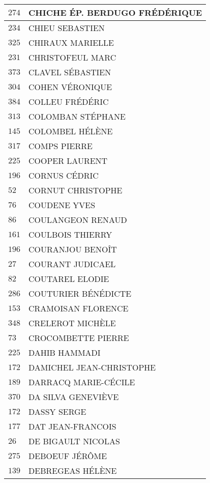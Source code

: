 \begin{xltabular}{\linewidth}{|l|X|}
    \hline
    $274$ & CHICHE ÉP. BERDUGO FRÉDÉRIQUE \\
    \hline
    $234$ & CHIEU SEBASTIEN \\
    \hline
    $325$ & CHIRAUX MARIELLE \\
    \hline
    $231$ & CHRISTOFEUL MARC \\
    \hline
    $373$ & CLAVEL SÉBASTIEN \\
    \hline
    $304$ & COHEN VÉRONIQUE \\
    \hline
    $384$ & COLLEU FRÉDÉRIC \\
    \hline
    $313$ & COLOMBAN STÉPHANE \\
    \hline
    $145$ & COLOMBEL HÉLÈNE \\
    \hline
    $317$ & COMPS PIERRE \\
    \hline
    $225$ & COOPER LAURENT \\
    \hline
    $196$ & CORNUS CÉDRIC \\
    \hline
    $52$ & CORNUT CHRISTOPHE \\
    \hline
    $76$ & COUDENE YVES \\
    \hline
    $86$ & COULANGEON RENAUD \\
    \hline
    $161$ & COULBOIS THIERRY \\
    \hline
    $196$ & COURANJOU BENOÎT \\
    \hline
    $27$ & COURANT JUDICAEL \\
    \hline
    $82$ & COUTAREL ELODIE \\
    \hline
    $286$ & COUTURIER BÉNÉDICTE \\
    \hline
    $153$ & CRAMOISAN FLORENCE \\
    \hline
    $348$ & CRELEROT MICHÈLE \\
    \hline
    $73$ & CROCOMBETTE PIERRE \\
    \hline
    $225$ & DAHIB HAMMADI \\
    \hline
    $172$ & DAMICHEL JEAN-CHRISTOPHE \\
    \hline
    $189$ & DARRACQ MARIE-CÉCILE \\
    \hline
    $370$ & DA SILVA GENEVIÈVE \\
    \hline
    $172$ & DASSY SERGE \\
    \hline
    $177$ & DAT JEAN-FRANCOIS \\
    \hline
    $26$ & DE BIGAULT NICOLAS \\
    \hline
    $275$ & DEBOEUF JÉRÔME \\
    \hline
    $139$ & DEBREGEAS HÉLÈNE \\

\end{xltabular}
